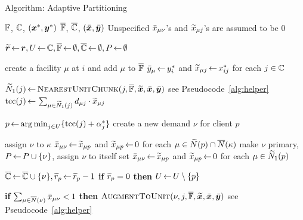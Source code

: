 \documentclass[oneside,final]{ucr}
\begin{document}
\begin{algorithm}[ht]
  \caption{Algorithm: Adaptive Partitioning}
  \label{alg:lpr2}
  \begin{algorithmic}[1]
    \Require $\mathbb{F}$, $\mathbb{C}$, $(\boldsymbol{x}^\ast,\boldsymbol{y}^\ast)$
    \Ensure  $\overline{\mathbb{F}}$,  $\overline{\mathbb{C}}$, $(\bar{\boldsymbol{x}}, \bar{\boldsymbol{y}})$ 
    \Comment Unspecified ${\bar x}_{\mu \nu}$'s and ${\widetilde x}_{\mu j}$'s are assumed to be $0$

    \State $\widetilde{\boldsymbol{r}} {\,\leftarrow\,} \boldsymbol{r}, U{\,\leftarrow\,} \mathbb{C}, \overline{\mathbb{F}}{\,\leftarrow\,} \emptyset,
    \overline{\mathbb{C}}{\,\leftarrow\,} \emptyset, P{\,\leftarrow\,} \emptyset$

    \State create a facility $\mu$ at $i$ and add $\mu$ to $\overline{\mathbb{F}}$
    \State ${\bar y}_\mu {\,\leftarrow\,} y_i^\ast$ and ${\widetilde x}_{\mu j}{\,\leftarrow\,}
    x_{ij}^\ast$ for each $j\in\mathbb{C}$ 
    \EndFor

    \State ${\widetilde N}_1(j) {\,\leftarrow\,} {{\textsc{NearestUnitChunk}}}(j, \overline{\mathbb{F}}, \widetilde{\boldsymbol{x}}, \bar{\boldsymbol{x}}, \bar{\boldsymbol{y}})$ \Comment see Pseudocode~\ref{alg:helper}
    \State $\mbox{\rm{tcc}}(j){\,\leftarrow\,} \sum_{\mu\in {\widetilde N}_1(j)} d_{{\mu}j}\cdot {\widetilde x}_{\mu j}$
    \EndFor
 
    \State $p {\,\leftarrow\,} {\operatorname*{arg\,min}}_{j\in U}\{ \mbox{\rm{tcc}}(j)+\alpha_j^\ast \}$
    \State create a new demand $\nu$ for client $p$

    \State assign $\nu$ to $\kappa$
    \State ${\bar x}_{\mu \nu}{\,\leftarrow\,} {\widetilde x}_{\mu p}$ and ${\widetilde x}_{\mu p}{\,\leftarrow\,} 0$ for each $\mu \in {\widetilde N}(p) \cap {\overline{N}}(\kappa)$
    \Else 
    \State make $\nu$ primary, $P {\,\leftarrow\,} P \cup \{\nu\}$, assign $\nu$ to itself
    \State set ${\bar x}_{\mu\nu} {\,\leftarrow\,} {\widetilde x}_{\mu p}$ and ${\widetilde x}_{\mu p}{\,\leftarrow\,} 0$ for each $\mu\in {\widetilde N}_1(p)$

    \EndIf
    \State $\overline{\mathbb{C}}{\,\leftarrow\,} \overline{\mathbb{C}}\cup \{\nu\},
    {\widetilde r}_p {\,\leftarrow\,} {\widetilde r}_p -1$
	\State \textbf{if} {${\widetilde r}_p=0$} \textbf{then} $U{\,\leftarrow\,} U \setminus \{p\}$
    \EndWhile

     
        
    \State \textbf{if} $\sum_{\mu\in {\overline{N}}(\nu)}{\bar x}_{\mu\nu}<1$
    \textbf{then} ${\textsc{AugmentToUnit}}(\nu, j, \overline{\mathbb{F}}, \widetilde{\boldsymbol{x}}, \bar{\boldsymbol{x}}, \bar{\boldsymbol{y}})$ \Comment see Pseudocode~\ref{alg:helper}
    \EndFor
    \EndFor
  \end{algorithmic}
\end{algorithm}
\end{document}
